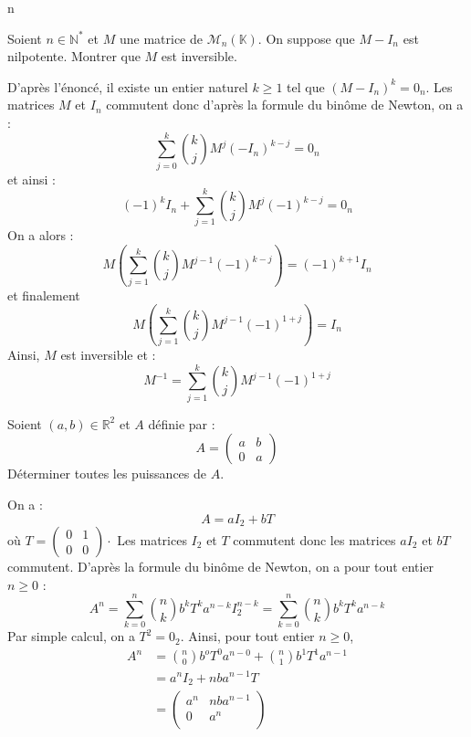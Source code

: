 n\documentclass[a4paper,10pt]{report}
\begin{document}
\begin{Exa} Soient $n \in \mathbb{N}^*$ et $M$ une matrice de $\mathcal{M}_n(\mathbb{K})$. On suppose que $M-I_n$ est nilpotente. Montrer que $M$ est inversible.
\end{Exa} 

\corr D'après l'énoncé, il existe un entier naturel $k \geq 1$ tel que $(M-I_n)^k = 0_n$. Les matrices $M$ et $I_n$ commutent donc d'après la formule du binôme de Newton, on a :
$$ \sum_{j=0}^k \binom{k}{j} M^j (-I_n)^{k-j} = 0_n$$
et ainsi :
$$ (-1)^k I_n + \sum_{j=1}^k \binom{k}{j} M^j (-1)^{k-j} = 0_n$$
On a alors :
$$ M \left(\sum_{j=1}^k \binom{k}{j} M^{j-1} (-1)^{k-j} \right) = (-1)^{k+1} I_n$$
et finalement 
$$ M \left(\sum_{j=1}^k \binom{k}{j} M^{j-1} (-1)^{1+j} \right)= I_n$$
Ainsi, $M$ est inversible et :
$$ M^{-1} = \sum_{j=1}^k \binom{k}{j} M^{j-1} (-1)^{1+j} $$

\medskip

\begin{Exa} Soient $(a,b) \in \mathbb{R}^2$ et $A$ définie par :
$$ A = \begin{pmatrix}
a & b \\
0  & a
\end{pmatrix}$$ 
Déterminer toutes les puissances de $A$.
\end{Exa}

\corr On a :
$$ A = a I_2 + b T$$
où $T = \begin{pmatrix}
0 & 1 \\
0 & 0
\end{pmatrix} \cdot$ Les matrices $I_2$ et $T$ commutent donc les matrices $a I_2$ et $bT$ commutent. D'après la formule du binôme de Newton, on a pour tout entier $n \geq 0$ :
$$ A^n = \sum_{k=0}^n \binom{n}{k} b^k T^k a^{n-k} I_2^{n-k} = \sum_{k=0}^n \binom{n}{k} b^k T^k a^{n-k} $$
Par simple calcul, on a $T^2 = 0_2$. Ainsi, pour tout entier $n \geq 0$,
\begin{align*}
 A^n  &= \binom{n}{0} b^o T^0 a^{n-0} + \binom{n}{1} b^1 T^1 a^{n-1} \\
 & = a^n I_2 + nba^{n-1} T \\
 & = \begin{pmatrix}
 a^n & nba^{n-1} \\
 0 & a^n \\
 \end{pmatrix}
 \end{align*}
%
%
\end{document}
